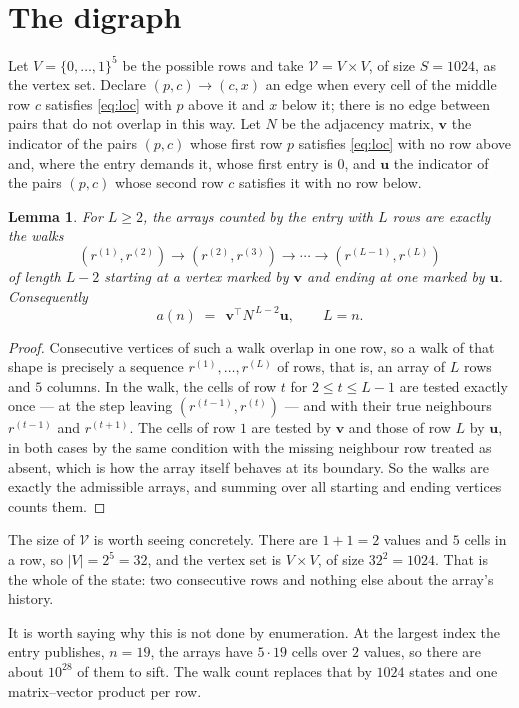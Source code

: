 \documentclass[11pt,a4paper]{article}
\theoremstyle{plain}
\newtheorem{lemma}[theorem]{Lemma}
\theoremstyle{definition}
\begin{document}
\section{The digraph}

Let $V=\{0,\dots,1\}^{5}$ be the possible rows and take
$\mathcal V=V\times V$, of size $S=1024$, as the vertex set. Declare $(p,c)\to(c,x)$ an edge
when every cell of the middle row $c$ satisfies \eqref{eq:loc} with $p$ above it and $x$
below it; there is no edge between pairs that do not overlap in this way. Let $N$ be the
adjacency matrix, $\mathbf{v}$ the indicator of the pairs $(p,c)$ whose first row $p$
satisfies \eqref{eq:loc} with no row above and, where the entry demands it, whose first entry is $0$, and $\mathbf{u}$ the indicator of
the pairs $(p,c)$ whose second row $c$ satisfies it with no row below.

\begin{lemma}\label{lem:walk}
For $L\ge2$, the arrays counted by the entry with $L$ rows are exactly the walks
\[
(r^{(1)},r^{(2)})\to(r^{(2)},r^{(3)})\to\cdots\to(r^{(L-1)},r^{(L)})
\]
of length $L-2$ starting at a vertex marked by $\mathbf{v}$ and ending at one marked by
$\mathbf{u}$. Consequently
\[
a(n)\;=\;\,\mathbf{v}^{\!\top}N^{\,L-2}\mathbf{u},\qquad L=n .
\]
\end{lemma}

\begin{proof}
Consecutive vertices of such a walk overlap in one row, so a walk of that shape is
precisely a sequence $r^{(1)},\dots,r^{(L)}$ of rows, that is, an array of $L$ rows
and $5$ columns. In the walk, the cells of row $t$ for $2\le t\le L-1$ are tested
exactly once --- at the step leaving $(r^{(t-1)},r^{(t)})$ --- and with their true
neighbours $r^{(t-1)}$ and $r^{(t+1)}$. The cells of row $1$ are tested by
$\mathbf{v}$ and those of row $L$ by $\mathbf{u}$, in both cases by the same condition
with the missing neighbour row treated as absent, which is how the array itself behaves at
its boundary. So the walks are exactly the admissible arrays, and summing over all starting
and ending vertices counts them.
\end{proof}


The size of $\mathcal V$ is worth seeing concretely. There are $1+1=2$ values
and $5$ cells in a row, so $|V|=2^{5}=32$, and the vertex set is
$V\times V$, of size $32^2=1024$. That is the whole of the state: two consecutive
rows and nothing else about the array's history.

It is worth saying why this is not done by enumeration. At the largest index the entry
publishes, $n=19$, the arrays have $5\cdot19$ cells over
$2$ values, so there are about $10^{28}$ of them to sift. The
walk count replaces that by $1024$ states and one matrix--vector product per row.
\end{document}
